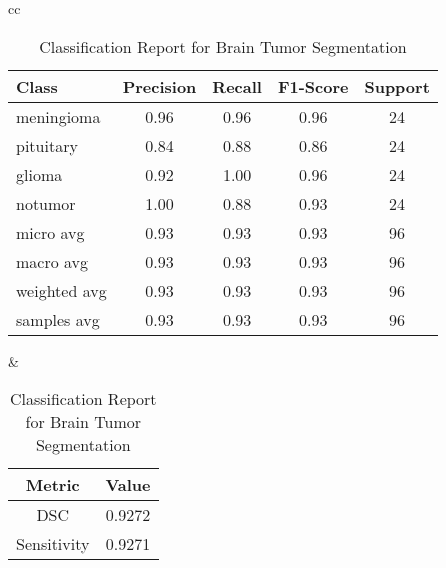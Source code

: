 \begin{table}[ht]
\centering
\begin{tabular}{cc}
    \begin{minipage}{.6\linewidth}
        \centering
        \begin{subtable}[t]{\linewidth}
            \centering
            \begin{tabular}{|l|c|c|c|c|}
                \hline 
                \textbf{Class} & \textbf{Precision} & \textbf{Recall} & \textbf{F1-Score} & \textbf{Support} \\ 
                \hline 
                meningioma & 0.96 & 0.96 & 0.96 & 24 \\ 
                \hline
                pituitary  & 0.84 & 0.88 & 0.86 & 24 \\ 
                \hline
                glioma     & 0.92 & 1.00 & 0.96 & 24 \\ 
                \hline
                notumor    & 1.00 & 0.88 & 0.93 & 24 \\ 
                \hline
                micro avg  & 0.93 & 0.93 & 0.93 & 96 \\ 
                \hline
                macro avg  & 0.93 & 0.93 & 0.93 & 96 \\ 
                \hline
                weighted avg & 0.93 & 0.93 & 0.93 & 96 \\ 
                \hline
                samples avg & 0.93 & 0.93 & 0.93 & 96 \\ 
                \hline
            \end{tabular}
            \caption{Classification Report for Brain Tumor Segmentation} 
            \label{tab:inceptionv3_classification_report}
        \end{subtable}
    \end{minipage} &
    \begin{minipage}{.35\linewidth}
        \centering
        \begin{subtable}[t]{\linewidth}
            \centering
            \begin{tabular}{|c|c|}
                \hline 
                \textbf{Metric} & \textbf{Value} \\ 
                \hline
                DSC & 0.9272 \\ 
                \hline
                Sensitivity & 0.9271 \\ 

\end{tabular}
\end{subtable}
\end{minipage}
\end{tabular}
\end{table}
